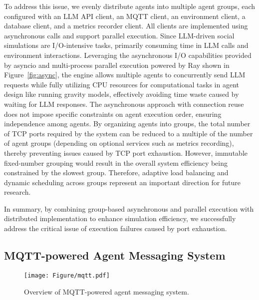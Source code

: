 To address this issue, we evenly distribute agents into multiple agent groups, each configured with an LLM API client, an MQTT client, an environment client, a database client, and a metrics recorder client.
All clients are implemented using asynchronous calls and support parallel execution.
Since LLM-driven social simulations are I/O-intensive tasks, primarily consuming time in LLM calls and environment interactions.
Leveraging the asynchronous I/O capabilities provided by asyncio and multi-process parallel execution powered by Ray shown in Figure~\ref{fig:async}, the engine allows multiple agents to concurrently send LLM requests while fully utilizing CPU resources for computational tasks in agent design like running gravity models, effectively avoiding time waste caused by waiting for LLM responses.
The asynchronous approach with connection reuse does not impose specific constraints on agent execution order, ensuring independence among agents.
By organizing agents into groups, the total number of TCP ports required by the system can be reduced to a multiple of the number of agent groups (depending on optional services such as metrics recording), thereby preventing issues caused by TCP port exhaustion.
However, immutable fixed-number grouping would result in the overall system efficiency being constrained by the slowest group.
Therefore, adaptive load balancing and dynamic scheduling across groups represent an important direction for future research.

In summary, by combining group-based asynchronous and parallel execution with distributed implementation to enhance simulation efficiency, we successfully address the critical issue of execution failures caused by port exhaustion.

\subsection{MQTT-powered Agent Messaging System}\label{sec:sim:mqtt}

\begin{figure}[ht]
\centering
\texttt{[image: Figure/mqtt.pdf]}
\caption{Overview of MQTT-powered agent messaging system.}
\label{fig:mqtt}
\end{figure}


